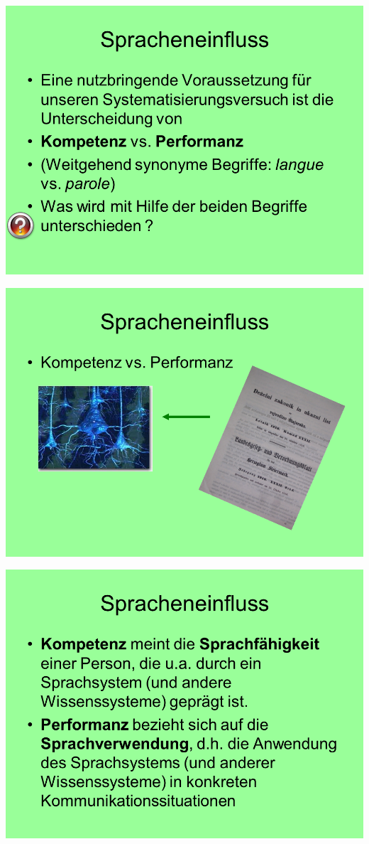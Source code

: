 \documentclass[
  letterpaper,
]{scrbook}
\begin{document}
\includegraphics[width=1\textwidth,height=\textheight]{./pictures/02_Spracheneinfluss_Sprachentrennung/Diapozitiv13.PNG}

\includegraphics[width=1\textwidth,height=\textheight]{./pictures/02_Spracheneinfluss_Sprachentrennung/Diapozitiv14.PNG}

\includegraphics[width=1\textwidth,height=\textheight]{./pictures/02_Spracheneinfluss_Sprachentrennung/Diapozitiv15.PNG}
\end{document}
